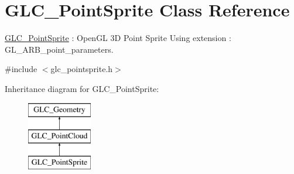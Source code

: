 \hypertarget{class_g_l_c___point_sprite}{\section{G\-L\-C\-\_\-\-Point\-Sprite Class Reference}
\label{class_g_l_c___point_sprite}
}


\hyperlink{class_g_l_c___point_sprite}{G\-L\-C\-\_\-\-Point\-Sprite} \-: Open\-G\-L 3\-D Point Sprite Using extension \-: G\-L\-\_\-\-A\-R\-B\-\_\-point\-\_\-parameters.  




{\ttfamily \#include $<$glc\-\_\-pointsprite.\-h$>$}

Inheritance diagram for G\-L\-C\-\_\-\-Point\-Sprite\-:\begin{figure}[H]
\begin{center}
\leavevmode
\includegraphics[height=3.000000cm]{class_g_l_c___point_sprite}
\end{center}
\end{figure}
